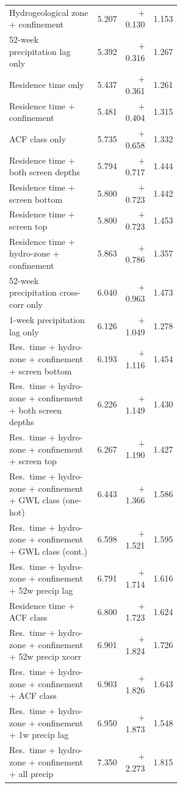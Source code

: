 \begin{longtable}{p{0.56\linewidth}rrr}
Hydrogeological zone + confinement         & 5.207 & $+$0.130 & 1.153 \\
52-week precipitation lag only             & 5.392 & $+$0.316 & 1.267 \\
Residence time only                        & 5.437 & $+$0.361 & 1.261 \\
Residence time + confinement               & 5.481 & $+$0.404 & 1.315 \\
ACF class only                             & 5.735 & $+$0.658 & 1.332 \\
Residence time + both screen depths        & 5.794 & $+$0.717 & 1.444 \\
Residence time + screen bottom             & 5.800 & $+$0.723 & 1.442 \\
Residence time + screen top                & 5.800 & $+$0.723 & 1.453 \\
Residence time + hydro-zone + confinement  & 5.863 & $+$0.786 & 1.357 \\
52-week precipitation cross-corr only      & 6.040 & $+$0.963 & 1.473 \\
1-week precipitation lag only              & 6.126 & $+$1.049 & 1.278 \\
Res.\ time + hydro-zone + confinement + screen bottom  & 6.193 & $+$1.116 & 1.454 \\
Res.\ time + hydro-zone + confinement + both screen depths & 6.226 & $+$1.149 & 1.430 \\
Res.\ time + hydro-zone + confinement + screen top     & 6.267 & $+$1.190 & 1.427 \\
Res.\ time + hydro-zone + confinement + GWL class (one-hot) & 6.443 & $+$1.366 & 1.586 \\
Res.\ time + hydro-zone + confinement + GWL class (cont.) & 6.598 & $+$1.521 & 1.595 \\
Res.\ time + hydro-zone + confinement + 52w precip lag    & 6.791 & $+$1.714 & 1.616 \\
Residence time + ACF class                 & 6.800 & $+$1.723 & 1.624 \\
Res.\ time + hydro-zone + confinement + 52w precip xcorr  & 6.901 & $+$1.824 & 1.726 \\
Res.\ time + hydro-zone + confinement + ACF class         & 6.903 & $+$1.826 & 1.643 \\
Res.\ time + hydro-zone + confinement + 1w precip lag     & 6.950 & $+$1.873 & 1.548 \\
Res.\ time + hydro-zone + confinement + all precip        & 7.350 & $+$2.273 & 1.815 \\
\end{longtable}

